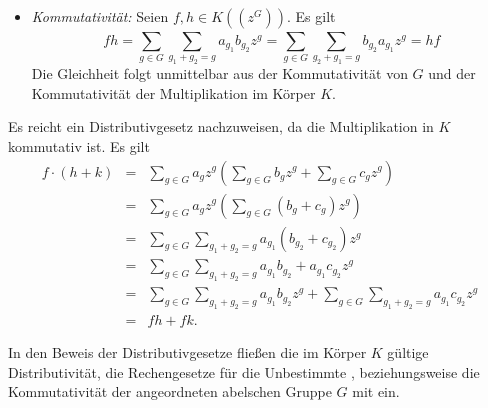 {\begin{itemize}
%
%
%
%
\item \textit{Kommutativität:} Seien $f,h \in K\left(\left(z^{G}\right)\right)$. Es gilt 
\[fh = \sum_{g \in G}^{}\sum_{g_1 + g_2 = g}^{}a_{g_1} b_{g_2}z^g = \sum_{g \in G}^{}\sum_{g_2 + g_1 = g}^{}b_{g_2} a_{g_1}z^g = hf\]
Die Gleichheit folgt unmittelbar aus der Kommutativität von $G$ und der Kommutativität der Multiplikation im Körper $K$.\\
\end{itemize}

Es reicht ein Distributivgesetz nachzuweisen, da die Multiplikation in $K$ kommutativ ist. Es gilt
\begin{eqnarray*}
f \cdot(h + k) &=& \sum_{g \in G}^{} a_g z^g  \left(\sum_{g \in G}^{} b_g z^g + \sum_{g \in G}^{} c_g z^g\right) \\
&=& \sum_{g \in G}^{} a_g z^g  \left(\sum_{g \in G}^{} \left(b_g + c_g\right) z^g \right)\\
&=& \sum_{g \in G}^{} \sum_{g_1 + g_2 = g}^{} a_{g_1}{\left(b_{g_2} + c_{g_2}\right)} z^g \\
&=& \sum_{g \in G}^{} \sum_{g_1 + g_2= g}^{} a_{g_1}b_{g_2} + a_{g_1}c_{g_2} z^g \\
&=& \sum_{g \in G}^{} \sum_{g_1 + g_2= g}^{} a_{g_1}b_{g_2}z^g + \sum_{g \in G}^{} \sum_{g_1 + g_2= g}^{} a_{g_1}c_{g_2} z^g \\
&=& fh + fk.
\end{eqnarray*}
%
%
%
% 
%
 
In den Beweis der Distributivgesetze fließen die im Körper $K$ gültige Distributivität, die Rechengesetze für die Unbestimmte
, beziehungsweise die Kommutativität der angeordneten abelschen Gruppe $G$ mit ein.  
}
%
